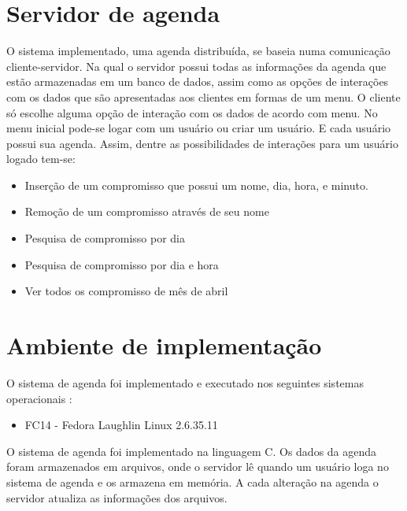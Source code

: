 \documentclass[10pt,a4paper]{article}
\begin{document}
\section{Servidor de agenda}
  O sistema implementado, uma agenda distribuída, se baseia numa comunicação
  cliente-servidor. Na qual o servidor possui todas as informações da
  agenda que estão armazenadas em um banco de dados,
  assim como as opções de interações com os dados que são apresentadas
  aos clientes em formas de um menu.
  O cliente só escolhe alguma opção de interação com os dados de
  acordo com menu.
  No menu inicial pode-se logar com um usuário ou criar um usuário. E cada
  usuário possui sua agenda. Assim, dentre as possibilidades de interações para um usuário logado tem-se:
  \begin{itemize}
  \item Inserção de um compromisso que possui um nome, dia, hora, e minuto. 
  \item Remoção de um compromisso através de seu nome
  \item Pesquisa de compromisso por dia
  \item Pesquisa de compromisso por dia e hora
  \item Ver todos os compromisso de mês de abril
  \end{itemize}
  
\section{Ambiente de implementação}
  O sistema de agenda foi implementado e executado nos seguintes sistemas operacionais :
  \begin{itemize}
  \item FC14 - Fedora Laughlin Linux 2.6.35.11
  \end{itemize}

  O sistema de agenda foi implementado na linguagem C. Os dados da
  agenda foram armazenados em arquivos, onde o servidor lê quando um
  usuário loga no sistema de agenda e os armazena em memória. 
  A cada alteração na agenda o servidor atualiza as informações dos arquivos.
\end{document}
